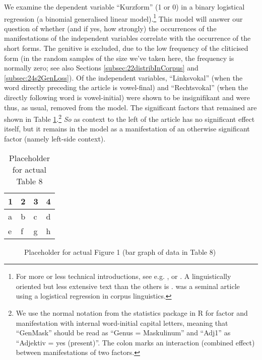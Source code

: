 We examine the dependent variable ``Kurzform'' (1 or 0) in a binary logistical regression (a binomial generalised linear model).\footnote{
	For more or less technical introductions, see e.g. \citet{BackhausEa2006}, \citet{FahrmeirEa2009} or \citet{ZuurEa2009}. A linguistically oriented but less extensive text than the others is \citet{Johnson2008}. \citet{BresnanEa2007} was a seminal article using a logistical regression in corpus linguistics.}
This model will answer our question of whether (and if yes, how strongly) the occurrences of the manifestations of the independent variables correlate with the occurrence of the short forms. 
The genitive is excluded, due to the low frequency of the cliticised form (in the random samples of the size we've taken here, the frequency is normally zero; see also Sections \ref{subsec:22distribInCorpus} and \ref{subsec:24s2GenLoss}).
Of the independent variables, ``Linksvokal'' (when the word directly preceding the article is vowel-final) and ``Rechtsvokal'' (when the directly following word is vowel-initial) were shown to be insignifikant and were thus, as usual, removed from the model.
The significant factors that remained are shown in Table \ref{tab:0008}.\footnote{
	We use the normal notation from the statistics package in R \citep{RCoreTeam2014} for factor and manifestation with internal word-initial capital letters, meaning that ``GenMask'' should be read as ``Genus = Maskulinum'' and ``Adj1'' as ``Adjektiv = yes (present)''.
	The colon marks an interaction (combined effect) between manifestations of two factors.}
\textit{So} as context to the left of the article has no significant effect itself, but it remains in the model as a manifestation of an otherwise significant factor (namely left-side context).

\begin{table}
	\centering
	\begin{tabular}{llll}
		\toprule
		\textbf{1} & \textbf{2} & \textbf{3} & \textbf{4} \\
		\midrule
		a & b & c & d \\
		e & f & g & h \\
		\bottomrule
	\end{tabular}
	\caption{Placeholder for actual Table 8}
	\label{tab:0008}
\end{table}

\begin{figure}[htpb!]    
	\centering
	\caption{Placeholder for actual Figure 1 (bar graph of data in Table 8)}
	\label{fig:0001}
\end{figure}


